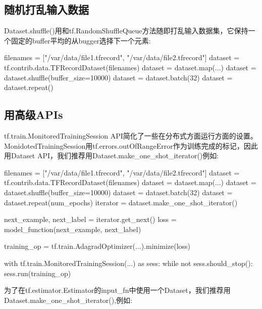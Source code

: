 \subsection{随机打乱输入数据}
Dataset.shuffle()用和tf.RandomShuffleQueue方法随即打乱输入数据集，它保持一个固定的buffer平均的从bugger选择下一个元素:
\begin{python}
filenames = ["/var/data/file1.tfrecord", "/var/data/file2.tfrecord"]
dataset = tf.contrib.data.TFRecordDataset(filenames)
dataset = dataset.map(...)
dataset = dataset.shuffle(buffer_size=10000)
dataset = dataset.batch(32)
dataset = dataset.repeat()
\end{python}
\subsection{用高级APIs}
tf.train.MonitoredTrainingSession API简化了一些在分布式方面运行方面的设置。MonidotedTrainingSession用tf.errors.outOfRangeError作为训练完成的标记，因此用Dataset API，我们推荐用Dataset.make\_one\_shot\_iterator()例如:
\begin{python}
filenames = ["/var/data/file1.tfrecord", "/var/data/file2.tfrecord"]
dataset = tf.contrib.data.TFRecordDataset(filenames)
dataset = dataset.map(...)
dataset = dataset.shuffle(buffer_size=10000)
dataset = dataset.batch(32)
dataset = dataset.repeat(num_epochs)
iterator = dataset.make_one_shot_iterator()

next_example, next_label = iterator.get_next()
loss = model_function(next_example, next_label)

training_op = tf.train.AdagradOptimizer(...).minimize(loss)

with tf.train.MonitoredTrainingSession(...) as sess:
    while not sess.should_stop():
        sess.run(training_op)
\end{python}
为了在tf.estimator.Estimator的input\_fn中使用一个Dataset，我们推荐用Dataset.make\_one\_shot\_iterator(),例如:
